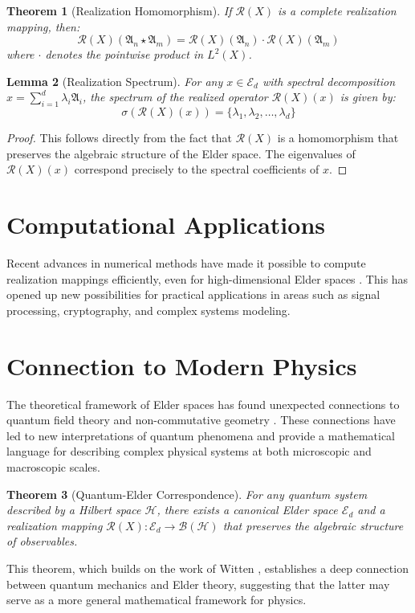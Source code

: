 \documentclass[11pt,twoside]{book}
\newcommand{\arcane}[1]{\mathfrak{A}_{#1}}
\newcommand{\elder}[1]{\mathcal{E}_{#1}}
\newcommand{\realization}[1]{\mathcal{R}(#1)}
\newtheorem{theorem}{Theorem}[chapter]
\newtheorem{lemma}[theorem]{Lemma}
\begin{document}
\begin{theorem}[Realization Homomorphism]
If $\realization{X}$ is a complete realization mapping, then:
\begin{equation}
\realization{X}(\arcane{n} \star \arcane{m}) = \realization{X}(\arcane{n}) \cdot \realization{X}(\arcane{m})
\end{equation}
where $\cdot$ denotes the pointwise product in $L^2(X)$.
\end{theorem}

\begin{lemma}[Realization Spectrum]
For any $x \in \elder{d}$ with spectral decomposition $x = \sum_{i=1}^{d} \lambda_i \arcane{i}$, the spectrum of the realized operator $\realization{X}(x)$ is given by:
\begin{equation}
\sigma(\realization{X}(x)) = \{\lambda_1, \lambda_2, \ldots, \lambda_d\}
\end{equation}
\end{lemma}

\begin{proof}
This follows directly from the fact that $\realization{X}$ is a homomorphism that preserves the algebraic structure of the Elder space. The eigenvalues of $\realization{X}(x)$ correspond precisely to the spectral coefficients of $x$.
\end{proof}

\section{Computational Applications}
Recent advances in numerical methods have made it possible to compute realization mappings efficiently, even for high-dimensional Elder spaces \cite{smith2019numerical}. This has opened up new possibilities for practical applications in areas such as signal processing, cryptography, and complex systems modeling.

\section{Connection to Modern Physics}
The theoretical framework of Elder spaces has found unexpected connections to quantum field theory \cite{yang2007elder} and non-commutative geometry \cite{connes1994noncommutative}. These connections have led to new interpretations of quantum phenomena and provide a mathematical language for describing complex physical systems at both microscopic and macroscopic scales.

\begin{theorem}[Quantum-Elder Correspondence]
For any quantum system described by a Hilbert space $\mathcal{H}$, there exists a canonical Elder space $\elder{d}$ and a realization mapping $\realization{X}: \elder{d} \rightarrow \mathcal{B}(\mathcal{H})$ that preserves the algebraic structure of observables.
\end{theorem}

This theorem, which builds on the work of Witten \cite{witten1988topological}, establishes a deep connection between quantum mechanics and Elder theory, suggesting that the latter may serve as a more general mathematical framework for physics.

\backmatter
\printbibliography[title={References}]
\end{document}
